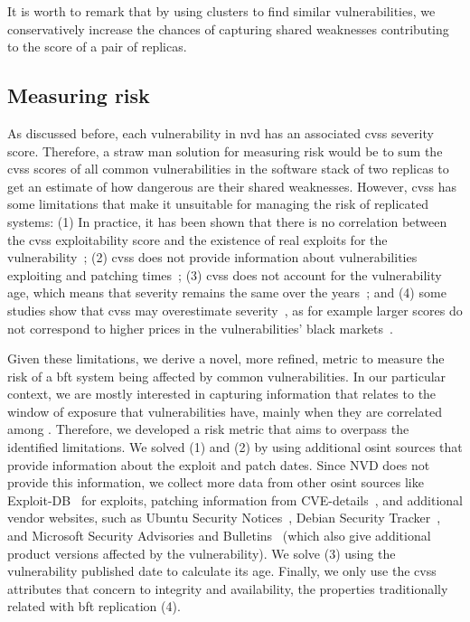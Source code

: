 It is worth to remark that by using clusters to find similar vulnerabilities, we conservatively increase the chances of capturing shared weaknesses contributing to the score of a pair of replicas.

\subsection{Measuring risk}
\label{sec:measurerisk}

As discussed before, each vulnerability in \gls{nvd} has an associated \gls{cvss} severity score. 
Therefore, a straw man solution for measuring risk would be to sum the \gls{cvss} scores of all common vulnerabilities in the software stack of two replicas to get an estimate of how dangerous are their shared weaknesses.
However, \gls{cvss} has some limitations that make it unsuitable for managing the risk of replicated systems:
(1) In practice, it has been shown that there is no correlation between the \gls{cvss} exploitability score and the existence of real exploits for the vulnerability~\cite{Bozorgi:2010}; 
(2) \gls{cvss} does not provide information about vulnerabilities exploiting and patching times~\cite{Nappa:2015}; 
(3) \gls{cvss} does not account for the vulnerability age, which means that severity remains the same over the years~\cite{Frei:2006,Melo:2013}; 
and (4) some studies show that \gls{cvss} may overestimate severity~\cite{Sabottke:2015}, as for example larger scores do not correspond to higher prices in the vulnerabilities' black markets~\cite{Allodi:2014,Allodi:2017}.

Given these limitations, we derive a novel, more refined, metric to measure the risk of a \gls{bft} system being affected by common vulnerabilities.
In our particular context, we are mostly interested in capturing information that relates to the window of exposure that vulnerabilities have, mainly when they are correlated among \replicas.
Therefore, we developed a risk metric that aims to overpass the identified limitations. 
We solved (1) and (2) by using additional \gls{osint} sources that provide information about the exploit and patch dates. 
Since NVD does not provide this information, we collect more data from other \gls{osint} sources like Exploit-DB~\cite{edb} for exploits, patching information from CVE-details~\cite{cvedetails}, and additional vendor websites, such as Ubuntu Security Notices~\cite{ubuntu}, Debian Security Tracker~\cite{debian}, and Microsoft Security Advisories and Bulletins~\cite{microsoft} (which also give additional product versions affected by the vulnerability).
We solve (3) using the vulnerability published date to calculate its age.
Finally, we only use the \gls{cvss} attributes that concern to integrity and availability, the properties traditionally related with \gls{bft} replication (4).



